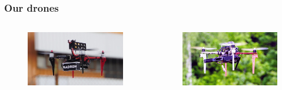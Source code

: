 \documentclass[aspectratio=169]{beamer}
\begin{document}

\begin{frame}
  \frametitle{Our drones}

  \begin{columns}[c]


    \begin{figure}
      \centering
      \includegraphics[width=1.0\textwidth]{./fig/uavs/f330_real.jpg}
    \end{figure}

    \vspace{-1em}

    \begin{figure}
      \centering
      \includegraphics[width=1.0\textwidth]{./fig/uavs/f450_real.jpg}
    \end{figure}

    \vspace{-1em}


\end{columns}
\end{frame}
\end{document}

